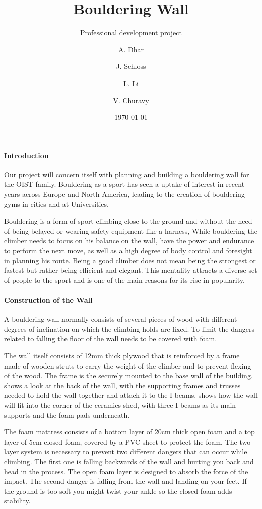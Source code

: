 \documentclass[a4paper, 12pt]{scrreprt}
\date{\today}
\title{Bouldering Wall}
\subtitle{Professional development project}
\author{A. Dhar}
\author{J. Schloss}
\author{L. Li}
\affil{Physical Sciences}
\author{V. Churavy}
\affil{Life Sciences}
\begin{document}
\maketitle
\paragraph{Introduction}
Our project will concern itself with planning and building a bouldering wall for the OIST family.
Bouldering as a sport has seen a uptake of interest in recent years across Europe and North America, leading to the creation of bouldering gyms in cities and at Universities. 

Bouldering is a form of sport climbing close to the ground and without the need of being belayed or wearing safety equipment like a harness, While bouldering the climber needs to focus on his balance on the wall, have the power and endurance to perform the next move, as well as a high degree of body control and foresight in planning his route. Being a good climber does not mean being the strongest or fastest but rather being efficient and elegant. This mentality attracts a diverse set of people to the sport and is one of the main reasons for its rise in popularity.

\paragraph{Construction of the Wall}
A bouldering wall normally consists of several pieces of wood with different degrees of inclination on which the climbing holds are fixed. To limit the dangers related to falling the floor of the wall needs to be covered with foam.

The wall itself consists of 12mm thick plywood that is reinforced by a frame made of wooden struts to carry the weight of the climber and to prevent flexing of the wood. The frame is the securely mounted to the base wall of the building. 
 shows a look at the back of the wall, with the supporting frames and trusses needed to hold the wall together and attach it to the I-beams.  shows how the wall will fit into the corner of the ceramics shed, with three I-beams as its main supports and the foam pads underneath.

The foam mattress consists of a bottom layer of 20cm thick open foam and a top layer of 5cm closed foam, covered by a PVC sheet to protect the foam.
The two layer system is necessary to prevent two different dangers that can occur while climbing. The first one is falling backwards of the wall and hurting you back and head in the process. The open foam layer is designed to absorb the force of the impact. The second danger is falling from the wall and landing on your feet. If the ground is too soft you might twist your ankle so the closed foam adds stability.
\end{document}
